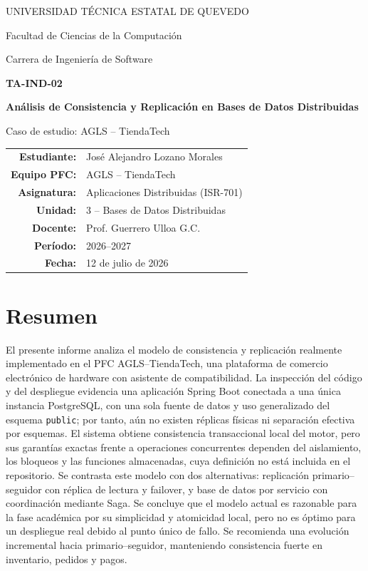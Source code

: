 \documentclass[11pt,a4paper]{article}
\begin{document}
\begin{titlepage}
  \centering
  {\large UNIVERSIDAD TÉCNICA ESTATAL DE QUEVEDO\par}
  \vspace{0.4cm}
  {\large Facultad de Ciencias de la Computación\par}
  {\large Carrera de Ingeniería de Software\par}
  \vfill
  {\Large\bfseries TA-IND-02\par}
  \vspace{0.5cm}
  {\LARGE\bfseries Análisis de Consistencia y Replicación en Bases de Datos Distribuidas\par}
  \vspace{0.4cm}
  {\Large Caso de estudio: AGLS -- TiendaTech\par}
  \vfill
  \begin{tabular}{rl}
    \textbf{Estudiante:} & José Alejandro Lozano Morales \\
    \textbf{Equipo PFC:} & AGLS -- TiendaTech \\
    \textbf{Asignatura:} & Aplicaciones Distribuidas (ISR-701) \\
    \textbf{Unidad:} & 3 -- Bases de Datos Distribuidas \\
    \textbf{Docente:} & Prof. Guerrero Ulloa G.C. \\
    \textbf{Período:} & 2026--2027 \\
    \textbf{Fecha:} & 12 de julio de 2026
  \end{tabular}
  \vfill
\end{titlepage}


\section*{Resumen}
El presente informe analiza el modelo de consistencia y replicación realmente implementado en el PFC AGLS--TiendaTech, una plataforma de comercio electrónico de hardware con asistente de compatibilidad. La inspección del código y del despliegue evidencia una aplicación Spring Boot conectada a una única instancia PostgreSQL, con una sola fuente de datos y uso generalizado del esquema \texttt{public}; por tanto, aún no existen réplicas físicas ni separación efectiva por esquemas. El sistema obtiene consistencia transaccional local del motor, pero sus garantías exactas frente a operaciones concurrentes dependen del aislamiento, los bloqueos y las funciones almacenadas, cuya definición no está incluida en el repositorio. Se contrasta este modelo con dos alternativas: replicación primario--seguidor con réplica de lectura y failover, y base de datos por servicio con coordinación mediante Saga. Se concluye que el modelo actual es razonable para la fase académica por su simplicidad y atomicidad local, pero no es óptimo para un despliegue real debido al punto único de fallo. Se recomienda una evolución incremental hacia primario--seguidor, manteniendo consistencia fuerte en inventario, pedidos y pagos.
\end{document}
